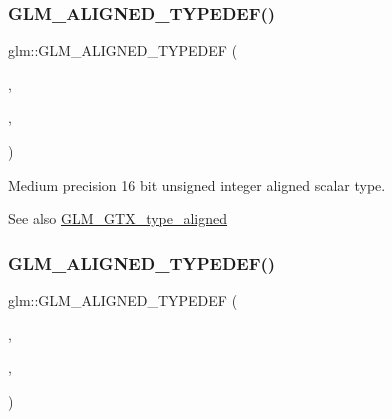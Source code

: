 \subsubsection{\texorpdfstring{G\+L\+M\+\_\+\+A\+L\+I\+G\+N\+E\+D\+\_\+\+T\+Y\+P\+E\+D\+E\+F()}{GLM\_ALIGNED\_TYPEDEF()}\hspace{0.1cm}{\footnotesize\ttfamily [82/209]}}
{\footnotesize\ttfamily glm\+::\+G\+L\+M\+\_\+\+A\+L\+I\+G\+N\+E\+D\+\_\+\+T\+Y\+P\+E\+D\+EF (\begin{DoxyParamCaption}\item[{\hyperlink{group__gtc__type__precision_ga2cef3a0d7b0fce75c9885f64656d8933}{mediump\+\_\+uint16}}]{,  }\item[{aligned\+\_\+mediump\+\_\+uint16}]{,  }\item[{2}]{ }\end{DoxyParamCaption})}

Medium precision 16 bit unsigned integer aligned scalar type. \begin{DoxySeeAlso}{See also}
\hyperlink{group__gtx__type__aligned}{G\+L\+M\+\_\+\+G\+T\+X\+\_\+type\+\_\+aligned} 
\end{DoxySeeAlso}
\mbox{\label{group__gtx__type__aligned_ga12566ca66d5962dadb4a5eb4c74e891e}} 
\subsubsection{\texorpdfstring{G\+L\+M\+\_\+\+A\+L\+I\+G\+N\+E\+D\+\_\+\+T\+Y\+P\+E\+D\+E\+F()}{GLM\_ALIGNED\_TYPEDEF()}\hspace{0.1cm}{\footnotesize\ttfamily [83/209]}}
{\footnotesize\ttfamily glm\+::\+G\+L\+M\+\_\+\+A\+L\+I\+G\+N\+E\+D\+\_\+\+T\+Y\+P\+E\+D\+EF (\begin{DoxyParamCaption}\item[{\hyperlink{group__gtc__type__precision_ga861dbd1051f488e425b3966001b568e5}{mediump\+\_\+uint32}}]{,  }\item[{aligned\+\_\+mediump\+\_\+uint32}]{,  }\item[{4}]{ }\end{DoxyParamCaption})}

